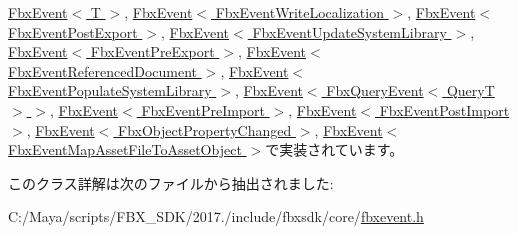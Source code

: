 \hyperlink{class_fbx_event_a96ae7ea5ee46f040f6493f6acecd5bba}{Fbx\+Event$<$ T $>$}, \hyperlink{class_fbx_event_a96ae7ea5ee46f040f6493f6acecd5bba}{Fbx\+Event$<$ Fbx\+Event\+Write\+Localization $>$}, \hyperlink{class_fbx_event_a96ae7ea5ee46f040f6493f6acecd5bba}{Fbx\+Event$<$ Fbx\+Event\+Post\+Export $>$}, \hyperlink{class_fbx_event_a96ae7ea5ee46f040f6493f6acecd5bba}{Fbx\+Event$<$ Fbx\+Event\+Update\+System\+Library $>$}, \hyperlink{class_fbx_event_a96ae7ea5ee46f040f6493f6acecd5bba}{Fbx\+Event$<$ Fbx\+Event\+Pre\+Export $>$}, \hyperlink{class_fbx_event_a96ae7ea5ee46f040f6493f6acecd5bba}{Fbx\+Event$<$ Fbx\+Event\+Referenced\+Document $>$}, \hyperlink{class_fbx_event_a96ae7ea5ee46f040f6493f6acecd5bba}{Fbx\+Event$<$ Fbx\+Event\+Populate\+System\+Library $>$}, \hyperlink{class_fbx_event_a96ae7ea5ee46f040f6493f6acecd5bba}{Fbx\+Event$<$ Fbx\+Query\+Event$<$ Query\+T $>$ $>$}, \hyperlink{class_fbx_event_a96ae7ea5ee46f040f6493f6acecd5bba}{Fbx\+Event$<$ Fbx\+Event\+Pre\+Import $>$}, \hyperlink{class_fbx_event_a96ae7ea5ee46f040f6493f6acecd5bba}{Fbx\+Event$<$ Fbx\+Event\+Post\+Import $>$}, \hyperlink{class_fbx_event_a96ae7ea5ee46f040f6493f6acecd5bba}{Fbx\+Event$<$ Fbx\+Object\+Property\+Changed $>$}, \hyperlink{class_fbx_event_a96ae7ea5ee46f040f6493f6acecd5bba}{Fbx\+Event$<$ Fbx\+Event\+Map\+Asset\+File\+To\+Asset\+Object $>$}で実装されています。



このクラス詳解は次のファイルから抽出されました\+:\begin{DoxyCompactItemize}
\item 
C\+:/\+Maya/scripts/\+F\+B\+X\+\_\+\+S\+D\+K/2017./include/fbxsdk/core/\hyperlink{fbxevent_8h}{fbxevent.\+h}\end{DoxyCompactItemize}
